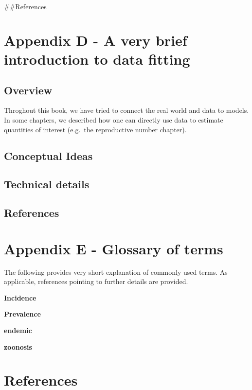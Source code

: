 \documentclass[]{book}
\theoremstyle{definition}
\theoremstyle{definition}
\theoremstyle{definition}
\theoremstyle{remark}
\begin{document}
\#\#References

\hypertarget{appendix-d---a-very-brief-introduction-to-data-fitting}{%
\chapter{Appendix D - A very brief introduction to data
fitting}\label{appendix-d---a-very-brief-introduction-to-data-fitting}}

\hypertarget{overview-2}{%
\section{Overview}\label{overview-2}}

Throghout this book, we have tried to connect the real world and data to
models. In some chapters, we described how one can directly use data to
estimate quantities of interest (e.g.~the reproductive number chapter).

\hypertarget{conceptual-ideas}{%
\section{Conceptual Ideas}\label{conceptual-ideas}}

\hypertarget{technical-details}{%
\section{Technical details}\label{technical-details}}

\hypertarget{references-3}{%
\section{References}\label{references-3}}

\hypertarget{glossary}{%
\chapter{Appendix E - Glossary of terms}\label{glossary}}

The following provides very short explanation of commonly used terms. As
applicable, references pointing to further details are provided.

\textbf{Incidence}

\textbf{Prevalence}

\textbf{endemic}

\textbf{zoonosis}

\hypertarget{references}{%
\chapter{References}\label{references}}
\end{document}
